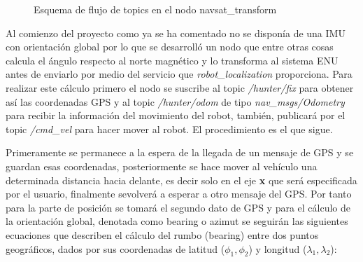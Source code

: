 \begin{figure}[h]
    

\begin{center}
\caption{Esquema de flujo de topics en el nodo navsat\_transform}
\label{fig:esquema_navsat}
\end{center}
\end{figure}

Al comienzo del proyecto como ya se ha comentado no se disponía de una IMU con orientación global por lo que se desarrolló un nodo que 
entre otras cosas calcula el ángulo respecto al norte magnético y lo transforma al sistema ENU antes de enviarlo por medio del servicio que \textit{robot\_localization} proporciona.
Para realizar este cálculo primero el nodo se suscribe al topic \textit{/hunter/fix} para obtener así las coordenadas GPS y al topic 
\textit{/hunter/odom} de tipo \textit{nav\_msgs/Odometry} para recibir la información del movimiento del robot, también, publicará por el topic 
\textit{/cmd\_vel} para hacer mover al robot. El procedimiento es el que sigue.

Primeramente se permanece a la espera de la llegada de un mensaje de GPS y se guardan esas coordenadas, posteriormente se hace mover al vehículo una 
determinada distancia hacia delante, es decir solo en el eje \textbf{x} que será 
especificada por el usuario, finalmente sevolverá a esperar a otro mensaje del GPS. Por tanto para la parte de posición se tomará el segundo 
dato de GPS y para el cálculo de la orientación global, denotada como bearing o azimut se seguirán las siguientes ecuaciones que describen el cálculo del rumbo (bearing) entre dos puntos geográficos, dados por sus coordenadas de 
latitud (\(\phi_1, \phi_2\)) y longitud (\(\lambda_1, \lambda_2\)):


